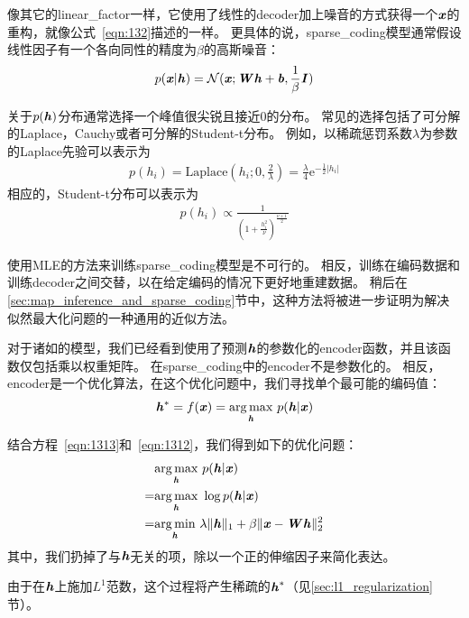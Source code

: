 像其它的\gls{linear_factor}一样，它使用了线性的\gls{decoder}加上噪音的方式获得一个$\boldsymbol{\mathit{x}}$的重构，就像公式~\eqref{eqn:132}描述的一样。
更具体的说，\gls{sparse_coding}模型通常假设线性因子有一个各向同性的精度为$\beta$的高斯噪音：
\begin{align}
\label{eqn:1312}
p(\boldsymbol{\mathit{x}}\vert\boldsymbol{\mathit{h}}) = \mathcal{N}
(\boldsymbol{\mathit{x}};\boldsymbol{\mathit{W}}\boldsymbol{\mathit{h}} + \boldsymbol{\mathit{b}} ,\frac{1}{\beta}\boldsymbol{\mathit{I}})
\end{align}


关于$p(\boldsymbol{\mathit{h}})$分布通常选择一个峰值很尖锐且接近0的分布\citep{Olshausen+Field-1996}。
常见的选择包括了可分解的Laplace，Cauchy或者可分解的Student-t分布。
例如，以稀疏惩罚系数$\lambda$为参数的Laplace先验可以表示为
\begin{align}
\label{eqn:1313}
p(h_i) = \text{Laplace}(h_i;0,\frac{2}{\lambda}) = \frac{\lambda}{4} \text{e}^{ -\frac{1}{2}\vert h_i\vert}
\end{align}
相应的，Student-t分布可以表示为
\begin{align}
\label{eqn:1314}
p(h_i)\propto \frac{1}{(1+\frac{h_i^2}{\nu})^{\frac{\nu+1}{2}}}
\end{align}

使用\gls{MLE}的方法来训练\gls{sparse_coding}模型是不可行的。
相反，训练在编码数据和训练\gls{decoder}之间交替，以在给定编码的情况下更好地重建数据。
稍后在\ref{sec:map_inference_and_sparse_coding}节中，这种方法将被进一步证明为解决似然最大化问题的一种通用的近似方法。

对于诸如的模型，我们已经看到使用了预测$\boldsymbol{\mathit{h}}$的参数化的\gls{encoder}函数，并且该函数仅包括乘以权重矩阵。
在\gls{sparse_coding}中的\gls{encoder}不是参数化的。
相反，\gls{encoder}是一个优化算法，在这个优化问题中，我们寻找单个最可能的编码值：
\begin{align}
\label{eqn:1315}
\boldsymbol{\mathit{h}}^* = f(\boldsymbol{\mathit{x}}) = \underset{\boldsymbol{\mathit{h}}}{\arg\max}\  p(\boldsymbol{\mathit{h}}\vert\boldsymbol{\mathit{x}})
\end{align}


结合方程~\eqref{eqn:1313}和~\eqref{eqn:1312}，我们得到如下的优化问题：
\begin{align}
\label{eqn:1316}
& \underset{\boldsymbol{\mathit{h}}}{\arg\max}\  p(\boldsymbol{\mathit{h}}\vert\boldsymbol{\mathit{x}}) \\
= & \underset{\boldsymbol{\mathit{h}}}{\arg\max}\ \log  p(\boldsymbol{\mathit{h}}\vert\boldsymbol{\mathit{x}})\\
= & \underset{\boldsymbol{\mathit{h}}}{\arg\min}\ \lambda \Vert \boldsymbol{\mathit{h}}\Vert_1 + \beta  \Vert \boldsymbol{\mathit{x}} - \boldsymbol{\mathit{W}} \boldsymbol{\mathit{h}}\Vert_2^2
\end{align}
其中，我们扔掉了与$\boldsymbol{\mathit{h}}$无关的项，除以一个正的伸缩因子来简化表达。

由于在$\boldsymbol{\mathit{h}}$上施加$L^1$范数，这个过程将产生稀疏的$\boldsymbol{\mathit{h}}^*$（见\ref{sec:l1_regularization}节）。

